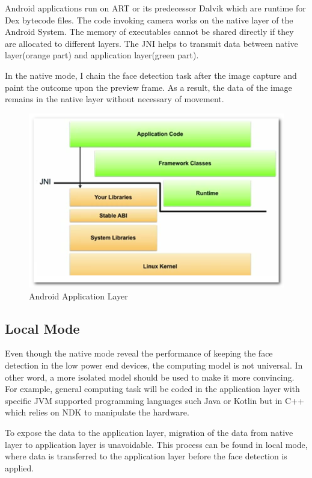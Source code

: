 Android applications run on ART or its predecessor Dalvik which are runtime for Dex bytecode files\cite{android-art}. The code invoking camera works on the native layer of the Android System. The memory of executables cannot be shared directly if they are allocated to different layers. The JNI helps to transmit data between native layer(orange part) and application layer(green part).

In the native mode, I chain the face detection task after the image capture and paint the outcome upon the preview frame. As a result, the data of the image remains in the native layer without necessary of movement.


\begin{figure}
    \centering
    \includegraphics[width=\textwidth]{images/jni.jpg}
    \caption{Android Application Layer}
    \label{fig:android_application_layer}
\end{figure}

\subsection{Local Mode}
Even though the native mode reveal the performance of keeping the face detection in the low power end devices, the computing model is not universal. In other word, a more isolated model should be used to make it more convincing. For example, general computing task will be coded in the application layer with specific JVM supported programming languages such Java or Kotlin but in C++ which relies on NDK to manipulate the hardware. 

To expose the data to the application layer, migration of the data from native layer to application layer is unavoidable. This process can be found in local mode, where data is transferred to the application layer before the face detection is applied.

